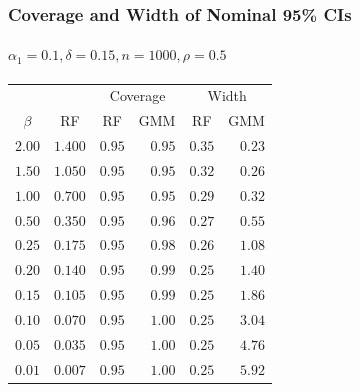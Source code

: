 \documentclass{beamer}
\begin{document}
\begin{frame}
  \frametitle{Coverage and Width of Nominal 95\% CIs}
  \framesubtitle{$\alpha_1 = 0.1, \delta = 0.15, n = 1000, \rho = 0.5$}
\begin{table}[!tbp]
  \small
\centering
\begin{tabular}{rrrrrr}
\hline\hline
&& \multicolumn{2}{c}{Coverage} & \multicolumn{2}{c}{Width}\\
\multicolumn{1}{c}{$\beta$}&\multicolumn{1}{c}{RF}&\multicolumn{1}{c}{RF}&\multicolumn{1}{c}{GMM}&\multicolumn{1}{c}{RF}&\multicolumn{1}{c}{GMM}\tabularnewline
\hline
$2.00$&$1.400$&$0.95$&$0.95$&$0.35$&$0.23$\tabularnewline
$1.50$&$1.050$&$0.95$&$0.95$&$0.32$&$0.26$\tabularnewline
$1.00$&$0.700$&$0.95$&$0.95$&$0.29$&$0.32$\tabularnewline
$0.50$&$0.350$&$0.95$&$0.96$&$0.27$&$0.55$\tabularnewline
$0.25$&$0.175$&$0.95$&$0.98$&$0.26$&$1.08$\tabularnewline
$0.20$&$0.140$&$0.95$&$0.99$&$0.25$&$1.40$\tabularnewline
$0.15$&$0.105$&$0.95$&$0.99$&$0.25$&$1.86$\tabularnewline
$0.10$&$0.070$&$0.95$&$1.00$&$0.25$&$3.04$\tabularnewline
$0.05$&$0.035$&$0.95$&$1.00$&$0.25$&$4.76$\tabularnewline
$0.01$&$0.007$&$0.95$&$1.00$&$0.25$&$5.92$\tabularnewline
\hline
\end{tabular}
\end{table}
\end{frame}
%
%    
%
%
\end{document}
